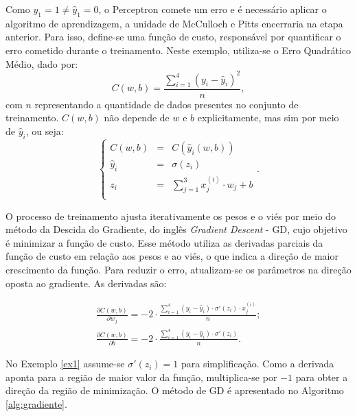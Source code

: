 Como $y_1 = 1 \neq \hat{y}_1 = 0$, o Perceptron comete um erro e é necessário aplicar o algoritmo de aprendizagem, a unidade de McCulloch e Pitts encerraria na etapa anterior. Para isso, define-se uma função de custo, responsável por quantificar o erro cometido durante o treinamento. Neste exemplo, utiliza-se o Erro Quadrático Médio, dado por: 
\begin{equation}
 \label{fuc:custo}
    C(w,b) = \frac{\sum_{i=1}^4(y_i - \hat{y}_i)^2}{n},   
\end{equation} 
com $n$ representando a quantidade de dados presentes no conjunto de treinamento. $C(w,b)$ não depende de $w$ e $b$ explicitamente, mas sim por meio de $\hat{y}_i$, ou seja:
$$
\left\{\begin{array}{ccc}
    C(w, b) & = & C(\hat{y}_i(w,b)) \\
    \hat{y}_i & = & \sigma(z_i) \\
    z_i & = & \sum_{j=1}^{3}x_j^{(i)}\cdot w_j + b \\
\end{array}\right.
.$$

O processo de treinamento ajusta iterativamente os pesos e o viés por meio do método da Descida do Gradiente, do inglês \textit{Gradient Descent} - GD, cujo objetivo é minimizar a função de custo. Esse método utiliza as derivadas parciais da função de custo em relação aos pesos e ao viés, o que indica a direção de maior crescimento da função. Para reduzir o erro, atualizam-se os parâmetros na direção oposta ao gradiente. As derivadas são:

\begin{align}
    \frac{\partial C(w,b)}{\partial w_j} = - 2\cdot\frac{\sum_{i=1}^4(y_i - \hat{y}_i) \cdot \sigma'(z_i)\cdot x^{(i)}_j}{n};\\
    \frac{\partial C(w,b)}{\partial b} = - 2\cdot\frac{\sum_{i=1}^4(y_i - \hat{y}_i)\cdot \sigma'(z_i)}{n}.
\end{align}
    

No Exemplo \ref{ex1} assume-se $\sigma'(z_i) = 1$ para simplificação. Como a derivada aponta para a região de maior valor da função, multiplica-se por $-1$ para obter a direção da região de minimização. O método de GD é apresentado no Algoritmo \ref{alg:gradiente}.
\vspace{0.5cm}

